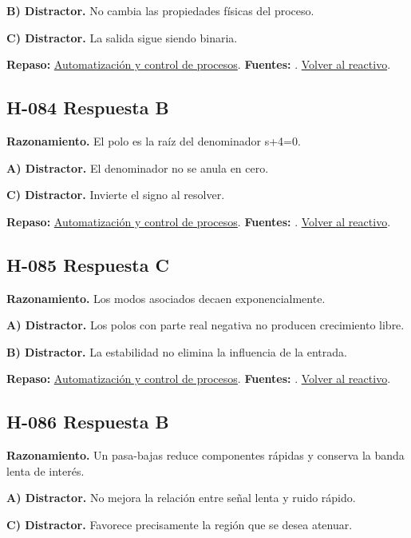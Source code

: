 \textbf{B) Distractor. }No cambia las propiedades físicas del proceso.

\textbf{C) Distractor. }La salida sigue siendo binaria.

\textbf{Repaso:} \hyperref[sec:h4]{Automatización y control de procesos}. \textbf{Fuentes:} \cite{control,signals,pid}. \hyperref[q:H-083]{Volver al reactivo}.\par\medskip

\subsection*{H-084 \quad Respuesta B}\label{s:H-084}
\textbf{Razonamiento.} El polo es la raíz del denominador s+4=0.

\textbf{A) Distractor. }El denominador no se anula en cero.

\textbf{C) Distractor. }Invierte el signo al resolver.

\textbf{Repaso:} \hyperref[sec:h4]{Automatización y control de procesos}. \textbf{Fuentes:} \cite{control,signals,pid}. \hyperref[q:H-084]{Volver al reactivo}.\par\medskip

\subsection*{H-085 \quad Respuesta C}\label{s:H-085}
\textbf{Razonamiento.} Los modos asociados decaen exponencialmente.

\textbf{A) Distractor. }Los polos con parte real negativa no producen crecimiento libre.

\textbf{B) Distractor. }La estabilidad no elimina la influencia de la entrada.

\textbf{Repaso:} \hyperref[sec:h4]{Automatización y control de procesos}. \textbf{Fuentes:} \cite{control,signals,pid}. \hyperref[q:H-085]{Volver al reactivo}.\par\medskip

\subsection*{H-086 \quad Respuesta B}\label{s:H-086}
\textbf{Razonamiento.} Un pasa-bajas reduce componentes rápidas y conserva la banda lenta de interés.

\textbf{A) Distractor. }No mejora la relación entre señal lenta y ruido rápido.

\textbf{C) Distractor. }Favorece precisamente la región que se desea atenuar.

